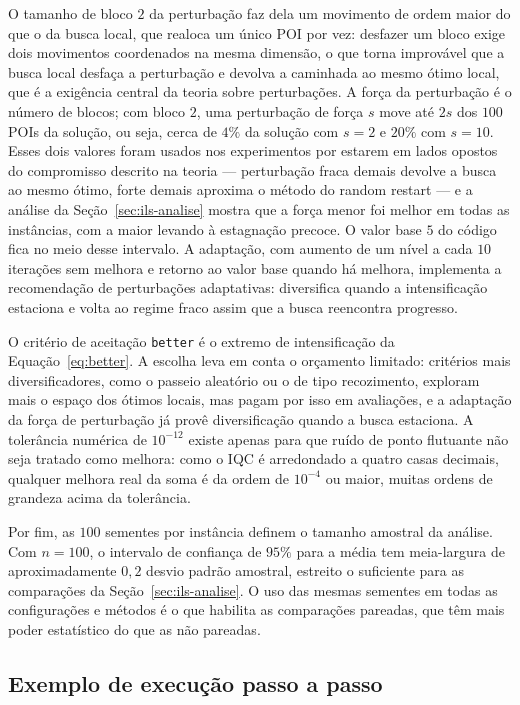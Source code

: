 \documentclass[11pt,a4paper]{article}
\newcommand{\code}[1]{\texttt{#1}}
\begin{document}
O tamanho de bloco $2$ da perturbação faz dela um movimento de ordem maior do que o da busca local, que realoca um único POI por vez: desfazer um bloco exige dois movimentos coordenados na mesma dimensão, o que torna improvável que a busca local desfaça a perturbação e devolva a caminhada ao mesmo ótimo local, que é a exigência central da teoria sobre perturbações. A força da perturbação é o número de blocos; com bloco $2$, uma perturbação de força $s$ move até $2s$ dos $100$ POIs da solução, ou seja, cerca de $4\%$ da solução com $s = 2$ e $20\%$ com $s = 10$. Esses dois valores foram usados nos experimentos por estarem em lados opostos do compromisso descrito na teoria — perturbação fraca demais devolve a busca ao mesmo ótimo, forte demais aproxima o método do random restart — e a análise da Seção~\ref{sec:ils-analise} mostra que a força menor foi melhor em todas as instâncias, com a maior levando à estagnação precoce. O valor base $5$ do código fica no meio desse intervalo. A adaptação, com aumento de um nível a cada $10$ iterações sem melhora e retorno ao valor base quando há melhora, implementa a recomendação de perturbações adaptativas: diversifica quando a intensificação estaciona e volta ao regime fraco assim que a busca reencontra progresso.

O critério de aceitação \code{better} é o extremo de intensificação da Equação~\eqref{eq:better}. A escolha leva em conta o orçamento limitado: critérios mais diversificadores, como o passeio aleatório ou o de tipo recozimento, exploram mais o espaço dos ótimos locais, mas pagam por isso em avaliações, e a adaptação da força de perturbação já provê diversificação quando a busca estaciona. A tolerância numérica de $10^{-12}$ existe apenas para que ruído de ponto flutuante não seja tratado como melhora: como o IQC é arredondado a quatro casas decimais, qualquer melhora real da soma é da ordem de $10^{-4}$ ou maior, muitas ordens de grandeza acima da tolerância.

Por fim, as $100$ sementes por instância definem o tamanho amostral da análise. Com $n = 100$, o intervalo de confiança de $95\%$ para a média tem meia-largura de aproximadamente $0{,}2$ desvio padrão amostral, estreito o suficiente para as comparações da Seção~\ref{sec:ils-analise}. O uso das mesmas sementes em todas as configurações e métodos é o que habilita as comparações pareadas, que têm mais poder estatístico do que as não pareadas.

\subsection{Exemplo de execução passo a passo}
\label{sec:exemplo}
\end{document}

